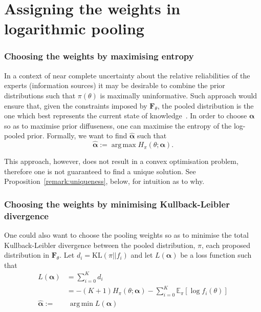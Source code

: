 \documentclass[a4paper, notitlepage, 10pt]{article}
\DeclareMathOperator*{\argmin}{arg\,min}
\DeclareMathOperator*{\argmax}{arg\,max}
\begin{document}
\section*{Assigning the weights in logarithmic pooling}

\subsubsection*{Choosing the weights by maximising entropy}

In a context of near complete uncertainty about the relative reliabilities of the experts (information sources) it may be desirable to combine the prior distributions such that $\pi(\theta)$ is maximally uninformative. %
Such approach would ensure that, given the constraints imposed by $\mathbf{F}_{\theta}$, the pooled distribution is the one which best represents the current state of knowledge~\citep{jaynes1957,savchuk1994}.
In order to choose $\boldsymbol\alpha$ so as to maximise prior 
diffuseness, one can maximise the entropy of the log-pooled prior.  
%
%
Formally, we want to find $\hat{\boldsymbol\alpha}$ such that
\begin{equation}
\label{eq:argmaxEnt}
 \hat{\boldsymbol\alpha}:= \argmax H_{\pi}(\theta; \boldsymbol\alpha).
\end{equation}

This approach, however, does not result in a convex optimisation problem, therefore one is not guaranteed to find a unique solution. 
See Proposition~\ref{remark:uniqueness}, below, for intuition as to why.

\subsubsection*{Choosing the weights by minimising Kullback-Leibler divergence}

One could also want to choose the pooling weights so as to minimise the total Kullback-Leibler divergence between the pooled distribution, $\pi$, each proposed distribution in $\mathbf{F}_{\theta}$.
Let $d_i = \text{KL}(\pi || f_i)$ and let $L(\boldsymbol\alpha)$ be a loss function such that
\begin{align}
L(\boldsymbol\alpha) &= \sum_{i=0}^K d_i \\
\label{eq:KLexpanded}
     &= - (K+1) H_\pi(\theta; \boldsymbol\alpha)  - \sum_{i=0}^K \mathbb{E}_\pi\left[\log f_i(\theta) \right] \\
     \label{eq:argminKL}
     \hat{\boldsymbol\alpha}:=& \:\argmin L(\boldsymbol\alpha)   
\end{align}
\end{document}
